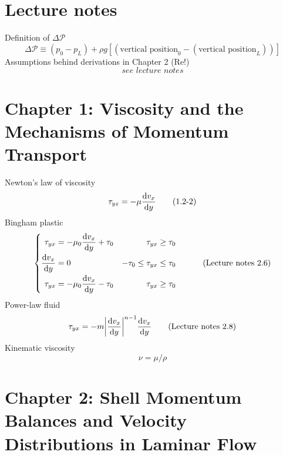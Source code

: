 \section{Lecture notes}
Definition of $\Delta\mathscr{P}$
\[
\Delta\mathscr{P}\equiv(p_0-p_L)+\rho g[(\text{vertical position}_0-(\text{vertical position}_L))]\tag{Lecture notes 3.17}
\]
Assumptions behind derivations in Chapter 2 (Re!)
\[
\textit{see lecture notes}\tag{Lecture notes 3.22}
\]
\section{Chapter 1: Viscosity and the Mechanisms of Momentum Transport}
Newton's law of viscosity
\[
	\tau_{yz}=-\mu\frac{\mathop{}\!\mathrm{d} v_x}{\mathop{}\!\mathrm{d} y}\tag{1.2-2}
\]
Bingham plastic
\[
\begin{cases}
	\begin{aligned}
		\tau_{yx}&=-\mu_0\frac{\mathop{}\!\mathrm{d} v_x}{\mathop{}\!\mathrm{d} y}+\tau_0& \tau_{yx}\geq\tau_0\\
		\frac{\mathop{}\!\mathrm{d} v_x}{\mathop{}\!\mathrm{d} y}&=0& -\tau_0\leq\tau_{yx}\leq\tau_0\\
		\tau_{yx}&=-\mu_0\frac{\mathop{}\!\mathrm{d} v_x}{\mathop{}\!\mathrm{d} y}-\tau_0& \tau_{yx}\geq\-\tau_0
	\end{aligned}
\end{cases}\tag{Lecture notes 2.6}
\]
Power-law fluid
\begin{align*}
	\tau_{yx}=-m\abs{\frac{\mathop{}\!\mathrm{d} v_x}{\mathop{}\!\mathrm{d} y}}^{n-1}\frac{\mathop{}\!\mathrm{d} v_x}{\mathop{}\!\mathrm{d} y}\tag{Lecture notes 2.8}
\end{align*}
Kinematic viscosity
\[
	\nu = \mu/\rho\tag{1.2-3}
\]
\section{Chapter 2: Shell Momentum Balances and Velocity Distributions in Laminar Flow}
